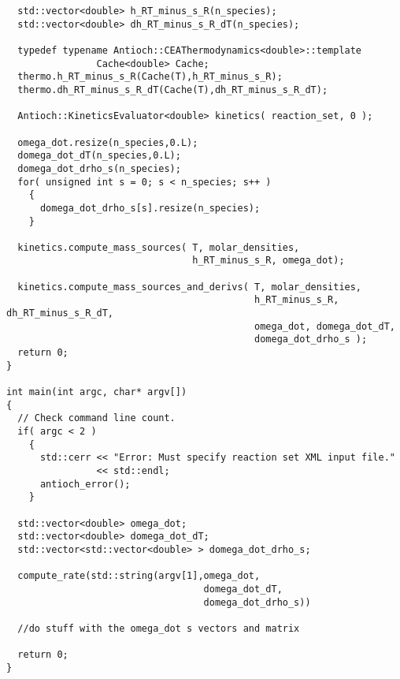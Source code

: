 \begin{verbatim}
  std::vector<double> h_RT_minus_s_R(n_species);
  std::vector<double> dh_RT_minus_s_R_dT(n_species);

  typedef typename Antioch::CEAThermodynamics<double>::template 
                Cache<double> Cache;
  thermo.h_RT_minus_s_R(Cache(T),h_RT_minus_s_R);
  thermo.dh_RT_minus_s_R_dT(Cache(T),dh_RT_minus_s_R_dT);

  Antioch::KineticsEvaluator<double> kinetics( reaction_set, 0 );

  omega_dot.resize(n_species,0.L);
  domega_dot_dT(n_species,0.L);
  domega_dot_drho_s(n_species);
  for( unsigned int s = 0; s < n_species; s++ )
    {
      domega_dot_drho_s[s].resize(n_species);
    }
  
  kinetics.compute_mass_sources( T, molar_densities, 
                                 h_RT_minus_s_R, omega_dot);

  kinetics.compute_mass_sources_and_derivs( T, molar_densities, 
                                            h_RT_minus_s_R, dh_RT_minus_s_R_dT,
                                            omega_dot, domega_dot_dT, 
                                            domega_dot_drho_s );
  return 0;
}

int main(int argc, char* argv[])
{
  // Check command line count.
  if( argc < 2 )
    {
      std::cerr << "Error: Must specify reaction set XML input file." 
                << std::endl;
      antioch_error();
    }

  std::vector<double> omega_dot;
  std::vector<double> domega_dot_dT;
  std::vector<std::vector<double> > domega_dot_drho_s;

  compute_rate(std::string(argv[1],omega_dot,
                                   domega_dot_dT,
                                   domega_dot_drho_s))

  //do stuff with the omega_dot s vectors and matrix

  return 0;
}
\end{verbatim}
\nolinenumbers

